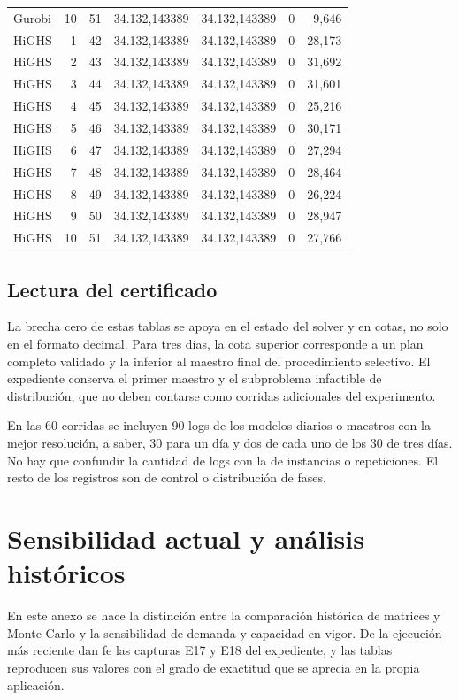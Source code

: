 \documentclass[12pt,a4paper,oneside]{article}
\begin{document}
{\begin{longtable}{lrrrrrr}
Gurobi & 10 & 51 & 34.132,143389 & 34.132,143389 & 0 & 9,646 \\
HiGHS & 1 & 42 & 34.132,143389 & 34.132,143389 & 0 & 28,173 \\
HiGHS & 2 & 43 & 34.132,143389 & 34.132,143389 & 0 & 31,692 \\
HiGHS & 3 & 44 & 34.132,143389 & 34.132,143389 & 0 & 31,601 \\
HiGHS & 4 & 45 & 34.132,143389 & 34.132,143389 & 0 & 25,216 \\
HiGHS & 5 & 46 & 34.132,143389 & 34.132,143389 & 0 & 30,171 \\
HiGHS & 6 & 47 & 34.132,143389 & 34.132,143389 & 0 & 27,294 \\
HiGHS & 7 & 48 & 34.132,143389 & 34.132,143389 & 0 & 28,464 \\
HiGHS & 8 & 49 & 34.132,143389 & 34.132,143389 & 0 & 26,224 \\
HiGHS & 9 & 50 & 34.132,143389 & 34.132,143389 & 0 & 28,947 \\
HiGHS & 10 & 51 & 34.132,143389 & 34.132,143389 & 0 & 27,766 \\
\end{longtable}}

\subsection{Lectura del certificado}
La brecha cero de estas tablas se apoya en el estado del solver y en cotas, no solo en el formato decimal. Para tres días, la cota superior corresponde a un plan completo validado y la inferior al maestro final del procedimiento selectivo. El expediente conserva el primer maestro y el subproblema infactible de distribución, que no deben contarse como corridas adicionales del experimento.

En las 60 corridas se incluyen 90 logs de los modelos diarios o maestros con la mejor resolución, a saber, 30 para un día y dos de cada uno de los 30 de tres días. No hay que confundir la cantidad de logs con la de instancias o repeticiones. El resto de los registros son de control o distribución de fases.

\clearpage
\section{Sensibilidad actual y análisis históricos}\label{an:historico}
En este anexo se hace la distinción entre la comparación histórica de matrices y Monte Carlo y la sensibilidad de demanda y capacidad en vigor. De la ejecución más reciente dan fe las capturas E17 y E18 del expediente, y las tablas reproducen sus valores con el grado de exactitud que se aprecia en la propia aplicación.
\end{document}
